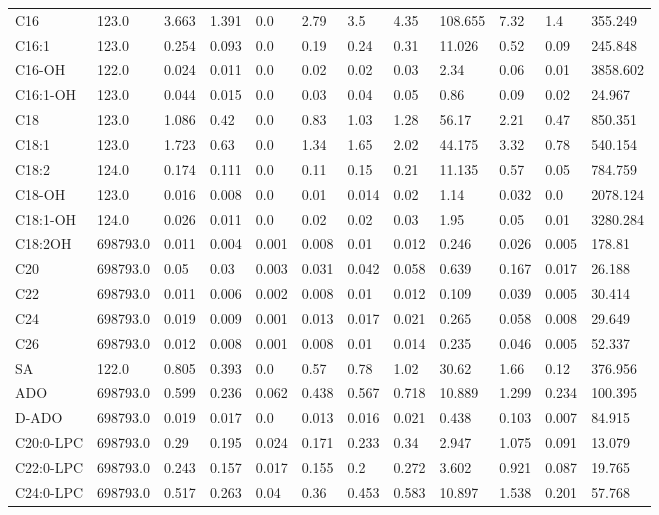 \begin{tabular}{llllllllllll}
C16 & 123.0 & 3.663 & 1.391 & 0.0 & 2.79 & 3.5 & 4.35 & 108.655 & 7.32 & 1.4 & 355.249 \\
C16:1 & 123.0 & 0.254 & 0.093 & 0.0 & 0.19 & 0.24 & 0.31 & 11.026 & 0.52 & 0.09 & 245.848 \\
C16-OH & 122.0 & 0.024 & 0.011 & 0.0 & 0.02 & 0.02 & 0.03 & 2.34 & 0.06 & 0.01 & 3858.602 \\
C16:1-OH & 123.0 & 0.044 & 0.015 & 0.0 & 0.03 & 0.04 & 0.05 & 0.86 & 0.09 & 0.02 & 24.967 \\
C18 & 123.0 & 1.086 & 0.42 & 0.0 & 0.83 & 1.03 & 1.28 & 56.17 & 2.21 & 0.47 & 850.351 \\
C18:1 & 123.0 & 1.723 & 0.63 & 0.0 & 1.34 & 1.65 & 2.02 & 44.175 & 3.32 & 0.78 & 540.154 \\
C18:2 & 124.0 & 0.174 & 0.111 & 0.0 & 0.11 & 0.15 & 0.21 & 11.135 & 0.57 & 0.05 & 784.759 \\
C18-OH & 123.0 & 0.016 & 0.008 & 0.0 & 0.01 & 0.014 & 0.02 & 1.14 & 0.032 & 0.0 & 2078.124 \\
C18:1-OH & 124.0 & 0.026 & 0.011 & 0.0 & 0.02 & 0.02 & 0.03 & 1.95 & 0.05 & 0.01 & 3280.284 \\
C18:2OH & 698793.0 & 0.011 & 0.004 & 0.001 & 0.008 & 0.01 & 0.012 & 0.246 & 0.026 & 0.005 & 178.81 \\
C20 & 698793.0 & 0.05 & 0.03 & 0.003 & 0.031 & 0.042 & 0.058 & 0.639 & 0.167 & 0.017 & 26.188 \\
C22 & 698793.0 & 0.011 & 0.006 & 0.002 & 0.008 & 0.01 & 0.012 & 0.109 & 0.039 & 0.005 & 30.414 \\
C24 & 698793.0 & 0.019 & 0.009 & 0.001 & 0.013 & 0.017 & 0.021 & 0.265 & 0.058 & 0.008 & 29.649 \\
C26 & 698793.0 & 0.012 & 0.008 & 0.001 & 0.008 & 0.01 & 0.014 & 0.235 & 0.046 & 0.005 & 52.337 \\
SA & 122.0 & 0.805 & 0.393 & 0.0 & 0.57 & 0.78 & 1.02 & 30.62 & 1.66 & 0.12 & 376.956 \\
ADO & 698793.0 & 0.599 & 0.236 & 0.062 & 0.438 & 0.567 & 0.718 & 10.889 & 1.299 & 0.234 & 100.395 \\
D-ADO & 698793.0 & 0.019 & 0.017 & 0.0 & 0.013 & 0.016 & 0.021 & 0.438 & 0.103 & 0.007 & 84.915 \\
C20:0-LPC & 698793.0 & 0.29 & 0.195 & 0.024 & 0.171 & 0.233 & 0.34 & 2.947 & 1.075 & 0.091 & 13.079 \\
C22:0-LPC & 698793.0 & 0.243 & 0.157 & 0.017 & 0.155 & 0.2 & 0.272 & 3.602 & 0.921 & 0.087 & 19.765 \\
C24:0-LPC & 698793.0 & 0.517 & 0.263 & 0.04 & 0.36 & 0.453 & 0.583 & 10.897 & 1.538 & 0.201 & 57.768 \\

\end{tabular}
